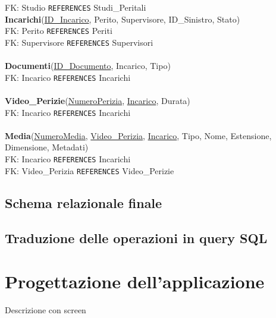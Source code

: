 \documentclass[a4paper,12pt]{report}
\begin{document}
FK: Studio \texttt{REFERENCES} Studi\_Peritali \\
\clearpage
\noindent
\textbf{Incarichi}(\underline{ID\_Incarico}, Perito, Supervisore, ID\_Sinistro, Stato) \\
FK: Perito \texttt{REFERENCES} Periti \\
FK: Supervisore \texttt{REFERENCES} Supervisori \\
\\
\textbf{Documenti}(\underline{ID\_Documento}, Incarico, Tipo) \\
FK: Incarico \texttt{REFERENCES} Incarichi \\
\\
\textbf{Video\_Perizie}(\underline{NumeroPerizia}, \underline{Incarico}, Durata) \\
FK: Incarico \texttt{REFERENCES} Incarichi \\
\\
\textbf{Media}(\underline{NumeroMedia}, \underline{Video\_Perizia}, \underline{Incarico}, Tipo, Nome, Estensione, Dimensione, Metadati) \\
FK: Incarico \texttt{REFERENCES} Incarichi \\
FK: Video\_Perizia \texttt{REFERENCES} Video\_Perizie \\

\section{Schema relazionale finale}
\section{Traduzione delle operazioni in query SQL}

\chapter{Progettazione dell'applicazione}


Descrizione con screen
\end{document}

